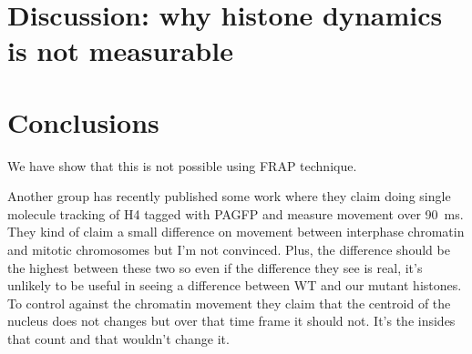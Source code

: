 
\section{Discussion: why histone dynamics is not measurable}


\section{Conclusions}
  We have show that this is not possible using FRAP technique.

  
  Another group has recently
  published some work where they claim doing single molecule tracking of H4 tagged with PAGFP
  and measure movement over \SI{90}{\ms}. They kind of claim
  a small difference on movement between interphase chromatin and mitotic chromosomes but
  I'm not convinced. Plus, the difference should be the highest between these two so even if
  the difference they see is real, it's unlikely to be useful in seeing a difference between
  WT and our mutant histones. To control against the chromatin movement they claim that the
  centroid of the nucleus does not changes but over that time frame it should not. It's the
  insides that count and that wouldn't change it.
  


